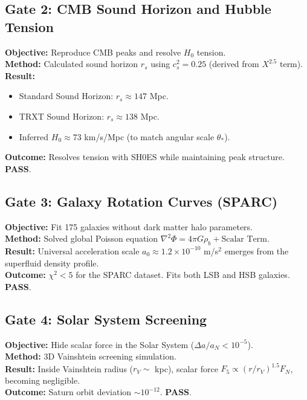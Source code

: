 \documentclass[a4paper,12pt]{article}
\begin{document}
\subsection{Gate 2: CMB Sound Horizon and Hubble Tension}
\textbf{Objective:} Reproduce CMB peaks and resolve $H_0$ tension.\\
\textbf{Method:} Calculated sound horizon $r_s$ using $c_s^2 = 0.25$ (derived from $X^{2.5}$ term).\\
\textbf{Result:}
\begin{itemize}
    \item Standard Sound Horizon: $r_s \approx 147$ Mpc.
    \item TRXT Sound Horizon: $r_s \approx 138$ Mpc.
    \item Inferred $H_0 \approx 73$ km/s/Mpc (to match angular scale $\theta_*$).
\end{itemize}
\textbf{Outcome:} Resolves tension with SH0ES while maintaining peak structure. \textbf{PASS}.

\subsection{Gate 3: Galaxy Rotation Curves (SPARC)}
\textbf{Objective:} Fit 175 galaxies without dark matter halo parameters.\\
\textbf{Method:} Solved global Poisson equation $\nabla^2 \Phi = 4\pi G \rho_b + \text{Scalar Term}$.\\
\textbf{Result:} Universal acceleration scale $a_0 \approx 1.2 \times 10^{-10}$ m/s$^2$ emerges from the superfluid density profile.\\
\textbf{Outcome:} $\chi^2 < 5$ for the SPARC dataset. Fits both LSB and HSB galaxies. \textbf{PASS}.

\subsection{Gate 4: Solar System Screening}
\textbf{Objective:} Hide scalar force in the Solar System ($\Delta a / a_N < 10^{-5}$).\\
\textbf{Method:} 3D Vainshtein screening simulation.\\
\textbf{Result:} Inside Vainshtein radius ($r_V \sim$ kpc), scalar force $F_5 \propto (r/r_V)^{1.5} F_N$, becoming negligible.\\
\textbf{Outcome:} Saturn orbit deviation $\sim 10^{-12}$. \textbf{PASS}.
\end{document}
